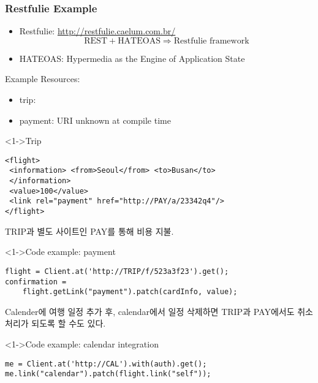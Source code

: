 \begin{frame}
\frametitle{Restfulie Example}

\begin{itemize}
\item Restfulie: \url{http://restfulie.caelum.com.br/}
\[
\mbox{REST} + \mbox{HATEOAS} \Rightarrow \mbox{Restfulie framework}
\]
\item HATEOAS: Hypermedia as the Engine of Application State
\end{itemize}

Example Resources:
\begin{itemize}
    \item trip: 
    \item payment: URI unknown at compile time
\end{itemize}

\begin{block}<1->{Trip}
\lstset{basicstyle=\ttfamily\small,language=xml}
\begin{lstlisting}
<flight>
 <information> <from>Seoul</from> <to>Busan</to> 
 </information>
 <value>100</value>
 <link rel="payment" href="http://PAY/a/23342q4"/>
</flight>
\end{lstlisting}
\end{block}

\pagebreak

TRIP과 별도 사이트인 PAY를 통해 비용 지불.

\begin{block}<1->{Code example: payment}
\lstset{basicstyle=\ttfamily\small,language=java}
\begin{lstlisting}
flight = Client.at('http://TRIP/f/523a3f23').get();
confirmation = 
    flight.getLink("payment").patch(cardInfo, value);
\end{lstlisting}
\end{block}

Calender에 여행 일정 추가 후, calendar에서 일정 삭제하면 TRIP과 PAY에서도 
취소 처리가 되도록 할 수도 있다.

\begin{block}<1->{Code example: calendar integration}
\lstset{basicstyle=\ttfamily\small,language=java}
\begin{lstlisting}
me = Client.at('http://CAL').with(auth).get();
me.link("calendar").patch(flight.link("self"));
\end{lstlisting}
\end{block}

\end{frame}

